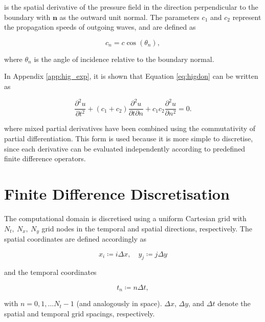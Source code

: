 \documentclass[final-report]{report-template}
\begin{document}
is the spatial derivative of the pressure field in the direction perpendicular to the boundary with $\mathbf n$ as the outward unit normal. The parameters $c_1$ and $c_2$ represent the propagation speeds of outgoing waves, and are defined as

\begin{equation}
    c_n = c \cos(\theta_n),
    \label{eq:phasevel}
\end{equation}

where $\theta_n$ is the angle of incidence relative to the boundary normal. 

In Appendix \ref{app:hig_exp}, it is shown that Equation \eqref{eq:higdon} can be written as

\begin{equation}
    \frac{\partial^2 u}{\partial t^2} + 
    (c_1 + c_2) \frac{\partial^2 u}{\partial t \partial n } + 
    c_1 c_2 \frac{\partial^2 u}{\partial n^2} = 0.
    \label{eq:higdon_expanded}
\end{equation}

where mixed partial derivatives have been combined using the commutativity of partial differentiation. This form is used because it is more simple to discretise, since each derivative can be evaluated independently according to predefined finite difference operators.

\section{Finite Difference Discretisation}
\label{subsect:discretisation}

The computational domain is discretised using a uniform Cartesian grid with $N_t,\ N_x,\ N_y$ grid nodes in the temporal and spatial directions, respectively. The spatial coordinates are defined accordingly as

\begin{equation}
    x_i \coloneqq i\Delta x, \quad y_j \coloneqq j\Delta y
    \label{eq:spatdisc}
\end{equation}

and the temporal coordinates

\begin{equation}
    t_n \coloneqq n\Delta t,
    \label{eq:tempdisc}
\end{equation}

with $n = 0, 1, \dots N_t - 1$ (and analogously in space). $\Delta x$, $\Delta y$, and $\Delta t$ denote the spatial and temporal grid spacings, respectively.
\end{document}
